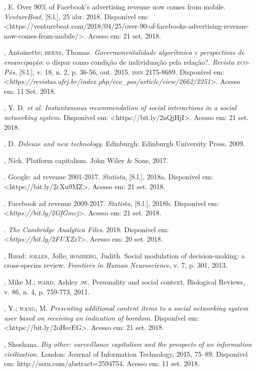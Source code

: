 \begin{bibliohedra}
, E. Over 90\% of Facebook's advertising revenue now comes
from mobile. \emph{VentureBeat}, {[}S.l.{]}, 25 abr. 2018. Disponível
em:
\textless{}https://venturebeat.com/2018/04/25/over-90-of-facebooks-advertising-revenue-now-comes-from-mobile/\textgreater{}.
Acesso em: 21 set. 2018.

, Antoinette; \textsc{berns}, Thomas. \emph{Governamentalidade
algorítmica e perspectivas de emancipação}: o díspar como condição de
individuação pela relação?. \emph{Revista \textsc{eco}-Pós}, {[}S.l.{]}, v. 18,
n. 2, p. 36-56, out. 2015. \textsc{issn} 2175-8689. Disponível em:
\textless{}\emph{https://revistas.ufrj.br/index.php/eco\_pos/article/view/2662/2251}\textgreater{}.
Acesso em: 11 Set. 2018.

, Y. D. \emph{et al.} \emph{Instantaneous recommendation of
social interactions in a social networking system}. Disponível em:
\textless{}https://bit.ly/2nQjHjI\textgreater{}.
Acesso em: 21 set. 2018.

, D. \emph{Deleuze and new technology}. Edinburgh: Edinburgh
University Press, 2009.

, Nick. Platform capitalism. John Wiley \& Sons, 2017.

. Google: ad revenue 2001-2017. \emph{Statista}, {[}S.l.{]},
2018a. Disponível em: \textless{}https://bit.ly/2cXu9MZ\textgreater{}.
Acesso em: 21 set. 2018.

\titidem. Facebook ad revenue 2009-2017. \emph{Statista},
{[}S.l.{]}, 2018b. Disponível em:
\textless{}\emph{https://bit.ly/2GfGmcj}\textgreater{}.
Acesso em: 21 set. 2018.

. \emph{The Cambridge Analytica Files}. 2018. Disponível
em: \textless{}\emph{https://bit.ly/2FUXZz7}\textgreater{}. Acesso em: 20 set. 2018.

, Ruud; \textsc{jolles}, Jolle; \textsc{homberg}, Judith. Social modulation of
decision-making: a cross-species review. \emph{Frontiers in Human
Neuroscience}, v. 7, p. 301, 2013.

, Mike M.; \textsc{ward}, Ashley \textsc{jw}. Personality and social context.
Biological Reviews, v. 86, n. 4, p. 759-773, 2011.

, Y.; \textsc{wang}, M. \emph{Presenting additional content items to a social
networking system user based on receiving an indication of boredom}.
Disponível em:
\textless{}https://bit.ly/2oHecEG\textgreater{}.
Acesso em: 21 set. 2018.

, Shoshana. \emph{Big other: surveillance capitalism and the
prospects of an information civilization.} London: Journal of
Information Technology, 2015, 75--89. Disponível em:
http://ssrn.com/abstract=2594754. Acesso em: 11 set. 2018.
\end{bibliohedra}


